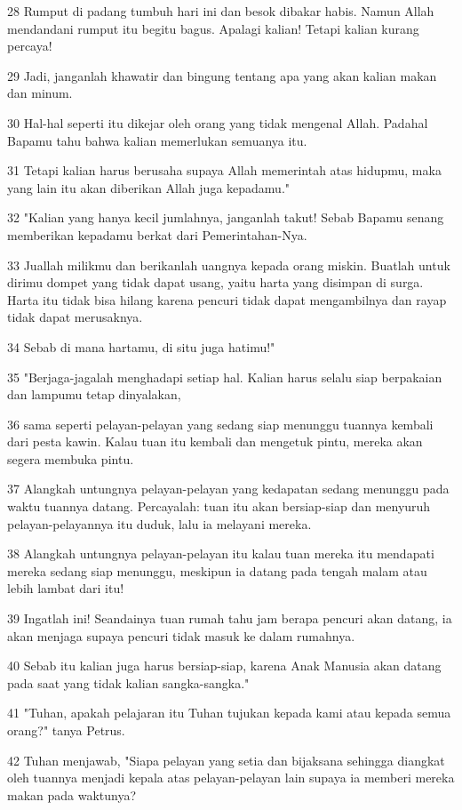 \par 28 Rumput di padang tumbuh hari ini dan besok dibakar habis. Namun Allah mendandani rumput itu begitu bagus. Apalagi kalian! Tetapi kalian kurang percaya!
\par 29 Jadi, janganlah khawatir dan bingung tentang apa yang akan kalian makan dan minum.
\par 30 Hal-hal seperti itu dikejar oleh orang yang tidak mengenal Allah. Padahal Bapamu tahu bahwa kalian memerlukan semuanya itu.
\par 31 Tetapi kalian harus berusaha supaya Allah memerintah atas hidupmu, maka yang lain itu akan diberikan Allah juga kepadamu."
\par 32 "Kalian yang hanya kecil jumlahnya, janganlah takut! Sebab Bapamu senang memberikan kepadamu berkat dari Pemerintahan-Nya.
\par 33 Juallah milikmu dan berikanlah uangnya kepada orang miskin. Buatlah untuk dirimu dompet yang tidak dapat usang, yaitu harta yang disimpan di surga. Harta itu tidak bisa hilang karena pencuri tidak dapat mengambilnya dan rayap tidak dapat merusaknya.
\par 34 Sebab di mana hartamu, di situ juga hatimu!"
\par 35 "Berjaga-jagalah menghadapi setiap hal. Kalian harus selalu siap berpakaian dan lampumu tetap dinyalakan,
\par 36 sama seperti pelayan-pelayan yang sedang siap menunggu tuannya kembali dari pesta kawin. Kalau tuan itu kembali dan mengetuk pintu, mereka akan segera membuka pintu.
\par 37 Alangkah untungnya pelayan-pelayan yang kedapatan sedang menunggu pada waktu tuannya datang. Percayalah: tuan itu akan bersiap-siap dan menyuruh pelayan-pelayannya itu duduk, lalu ia melayani mereka.
\par 38 Alangkah untungnya pelayan-pelayan itu kalau tuan mereka itu mendapati mereka sedang siap menunggu, meskipun ia datang pada tengah malam atau lebih lambat dari itu!
\par 39 Ingatlah ini! Seandainya tuan rumah tahu jam berapa pencuri akan datang, ia akan menjaga supaya pencuri tidak masuk ke dalam rumahnya.
\par 40 Sebab itu kalian juga harus bersiap-siap, karena Anak Manusia akan datang pada saat yang tidak kalian sangka-sangka."
\par 41 "Tuhan, apakah pelajaran itu Tuhan tujukan kepada kami atau kepada semua orang?" tanya Petrus.
\par 42 Tuhan menjawab, "Siapa pelayan yang setia dan bijaksana sehingga diangkat oleh tuannya menjadi kepala atas pelayan-pelayan lain supaya ia memberi mereka makan pada waktunya?
